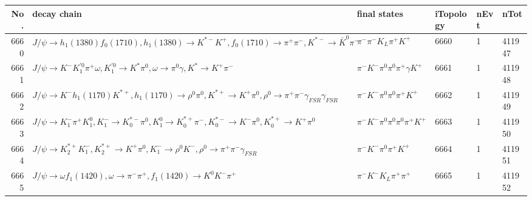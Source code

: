 \begin{table}[htbp] 
\begin{center}
\begin{small}
\begin{tabular}{rlllll}\hline\hline
 No. & decay chain & final states &  iTopology & nEvt & nTot \\\hline
6660&$J/\psi       \rightarrow h_{1}(1380)    f_{0}(1710)    , h_{1}(1380)     \rightarrow K^{*-}         K^{+}          , f_{0}(1710)     \rightarrow \pi^{+}        \pi^{-}        , K^{*-}          \rightarrow \bar{K}^{0}   \pi^{-}        $&$\pi^{-}        \pi^{-}        K_{L}          \pi^{+}        K^{+}          $& 6660&    1&411947\\
6661&$J/\psi       \rightarrow K^{-}          K_1^{'0}      \pi^{+}        \omega         , K_1^{'0}       \rightarrow K^{*}          \pi^{0}        , \omega          \rightarrow \pi^{0}        \gamma       , K^{*}           \rightarrow K^{+}          \pi^{-}        $&$\pi^{-}        K^{-}          \pi^{0}        \pi^{0}        \pi^{+}        \gamma       K^{+}          $& 6661&    1&411948\\
6662&$J/\psi       \rightarrow K^{-}          h_{1}(1170)    K^{*+}         , h_{1}(1170)     \rightarrow \rho^{0}      \pi^{0}        , K^{*+}          \rightarrow K^{+}          \pi^{0}        , \rho^{0}       \rightarrow \pi^{+}        \pi^{-}        \gamma_{FSR} \gamma_{FSR} $&$\pi^{-}        K^{-}          \pi^{0}        \pi^{0}        \pi^{+}        K^{+}          $& 6662&    1&411949\\
6663&$J/\psi       \rightarrow K_{1}^{-}      \pi^{+}        K_1^{0}        , K_{1}^{-}       \rightarrow K_{0}^{*-}     \pi^{0}        , K_1^{0}         \rightarrow K_{0}^{*+}     \pi^{-}        , K_{0}^{*-}      \rightarrow K^{-}          \pi^{0}        , K_{0}^{*+}      \rightarrow K^{+}          \pi^{0}        $&$\pi^{-}        K^{-}          \pi^{0}        \pi^{0}        \pi^{0}        \pi^{+}        K^{+}          $& 6663&    1&411950\\
6664&$J/\psi       \rightarrow K_2^{*+}       K_{1}^{-}      , K_2^{*+}        \rightarrow K^{+}          \pi^{0}        , K_{1}^{-}       \rightarrow \rho^{0}      K^{-}          , \rho^{0}       \rightarrow \pi^{+}        \pi^{-}        \gamma_{FSR} $&$\pi^{-}        K^{-}          \pi^{0}        \pi^{+}        K^{+}          $& 6664&    1&411951\\
6665&$J/\psi       \rightarrow \omega         f_{1}(1420)    , \omega          \rightarrow \pi^{-}        \pi^{+}        , f_{1}(1420)     \rightarrow K^{0}          K^{-}          \pi^{+}        $&$\pi^{-}        K^{-}          K_{L}          \pi^{+}        \pi^{+}        $& 6665&    1&411952\\

\end{tabular}
\end{small}
\end{center}
\end{table}
